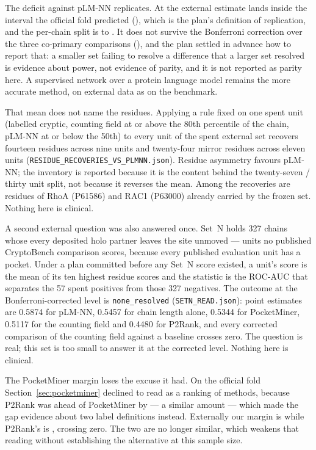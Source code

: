 \documentclass[11pt]{article}
\begin{document}
The deficit against pLM-NN replicates. At \ExtAucPlm{} \ExtAucCIPlm{} the
external estimate lands inside the interval the official fold predicted
(\ExtOldPlm{}), which is the plan's definition of replication, and the per-chain
split is \ExtWinPlm{} to \ExtLossPlm{}. It does not survive the Bonferroni
correction over the three co-primary comparisons (\ExtAucBonfPlm{}), and the
plan settled in advance how to report that: a smaller set failing to resolve a
difference that a larger set resolved is evidence about power, not evidence of
parity, and it is not reported as parity here. A supervised network over a
protein language model remains the more accurate method, on external data as on
the benchmark.

That mean does not name the residues. Applying a rule fixed on one spent unit
(labelled cryptic, counting field at or above the 80th percentile of the chain,
pLM-NN at or below the 50th) to every unit of the spent external set recovers
fourteen residues across nine units and twenty-four mirror residues across eleven
units (\texttt{RESIDUE\_RECOVERIES\_VS\_PLMNN.json}). Residue asymmetry favours
pLM-NN; the inventory is reported because it is the content behind the
twenty-seven / thirty unit split, not because it reverses the mean. Among the
recoveries are residues of RhoA (P61586) and RAC1 (P63000) already carried by the
frozen set. Nothing here is clinical.

A second external question was also answered once. Set~N holds 327 chains whose
every deposited holo partner leaves the site unmoved --- units no published
CryptoBench comparison scores, because every published evaluation unit has a
pocket. Under a plan committed before any Set~N score existed, a unit's score is
the mean of its ten highest residue scores and the statistic is the ROC-AUC that
separates the 57 spent positives from those 327 negatives. The outcome at the
Bonferroni-corrected level is \texttt{none\_resolved}
(\texttt{SETN\_READ.json}): point estimates are 0.5874 for pLM-NN, 0.5457 for
chain length alone, 0.5344 for PocketMiner, 0.5117 for the counting field and
0.4480 for P2Rank, and every corrected comparison of the counting field against a
baseline crosses zero. The question is real; this set is too small to answer it
at the corrected level. Nothing here is clinical.

The PocketMiner margin loses the excuse it had. On the official fold
Section~\ref{sec:pocketminer} declined to read \PmAucOurs{} as a ranking of
methods, because P2Rank was ahead of PocketMiner by \PmAucPtwoR{} --- a similar
amount --- which made the gap evidence about two label definitions instead.
Externally our margin is \ExtAucPm{} \ExtAucCIPm{} while P2Rank's is
\ExtPtwoRMinusPm{} \ExtPtwoRMinusPmCI{}, crossing zero. The two are no longer
similar, which weakens that reading without establishing the alternative at this
sample size.
\end{document}

